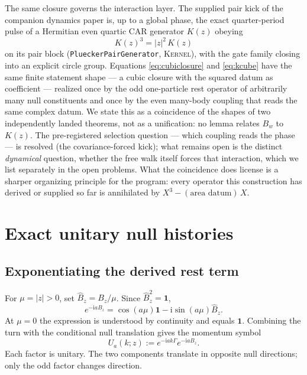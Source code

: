 \documentclass[11pt]{article}
\newcommand{\Kernel}{\textcolor{kernelcolor}{\textsc{Kernel}}}
\newcommand{\ii}{\mathrm{i}}
\newcommand{\id}{\mathbf{1}}
\begin{document}
The same closure governs the interaction layer.  The supplied pair kick
of the companion dynamics paper is, up to a global phase, the exact
quarter-period pulse of a Hermitian even quartic CAR generator $K(z)$
obeying
\begin{equation}\label{eq:kcube}
  K(z)^3=|z|^2\,K(z)
\end{equation}
on its pair block (\texttt{PlueckerPairGenerator}, \Kernel{}), with the
gate family closing into an explicit circle group.  Equations
\eqref{eq:cubiclosure} and \eqref{eq:kcube} have the same finite
statement shape --- a cubic closure with the squared datum as
coefficient ---
realized once by the odd one-particle rest operator of arbitrarily many
null constituents and once by the even many-body coupling that reads the
same complex datum.  We state this as a coincidence of the shapes of two
independently landed theorems, not as a unification: no lemma relates
$B_w$ to $K(z)$.  The pre-registered selection question --- which
coupling reads the phase --- is resolved (the covariance-forced kick);
what remains open is the distinct \emph{dynamical} question, whether the
free walk itself forces that interaction, which we list separately in
the open problems.  What the
coincidence does license is a sharper organizing principle for the
program: every operator this construction has derived or supplied so far
is annihilated by $X^3-(\text{area datum})\,X$.

\section{Exact unitary null histories}

\subsection{Exponentiating the derived rest term}

For $\mu=|z|>0$, set $\widehat B_z=B_z/\mu$.  Since
$\widehat B_z^2=\id$,
\begin{equation}\label{eq:expB}
 e^{-\ii aB_z}
 =\cos(a\mu)\id-\ii\sin(a\mu)\widehat B_z.
\end{equation}
At $\mu=0$ the expression is understood by continuity and equals $\id$.
Combining the turn with the conditional null translation gives the momentum
symbol
\begin{equation}\label{eq:walk}
 U_a(k;z):=e^{-\ii ak\Gamma}e^{-\ii aB_z}.
\end{equation}
Each factor is unitary.  The two components translate in opposite null
directions; only the odd factor changes direction.
\end{document}
